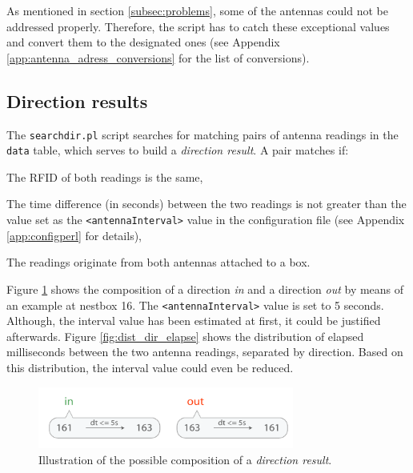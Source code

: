 As mentioned in section \ref{subsec:problems}, some of the antennas could not be addressed properly. Therefore, the script has to catch these exceptional values and convert them to the designated ones (see Appendix \ref{app:antenna_adress_conversions} for the list of conversions).

\subsection{Direction results}
\label{subsec:dirres}

The \lstinline|searchdir.pl| script searches for matching pairs of antenna readings in the \lstinline|data| table, which serves to build a \textit{direction result}. A pair matches if:

\begin{mylist}
\item The RFID of both readings is the same,
\item The time difference (in seconds) between the two readings is not greater than the value set as the \lstinline|<antennaInterval>| value in the configuration file (see Appendix \ref{app:configperl} for details), 
\item The readings originate from both antennas attached to a box.
\end{mylist}

Figure \ref{fig:direction_result} shows the composition of a direction \textit{in} and a direction \textit{out} by means of an example at nestbox 16. The \lstinline|<antennaInterval>| value is set to 5 seconds. Although, the interval value has been estimated at first, it could be justified afterwards. Figure \ref{fig:dist_dir_elapse} shows the distribution of elapsed milliseconds between the two antenna readings, separated by direction. Based on this distribution, the interval value could even be reduced.
 
\begin{figure}[htpb]
\begin{center}
  \includegraphics[width=0.75\textwidth]{assets/pdf/direction_result_schema.pdf}
  \caption[Illustration of a direction result]{Illustration of the possible composition of a \textit{direction result}.}
  \label{fig:direction_result}
\end{center}
\end{figure}

